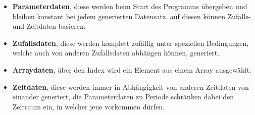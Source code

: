 \begin{itemize}
  \item \textbf{Parameterdaten}, diese werden beim Start des Programms übergeben und bleiben konstant bei jedem generierten Datensatz, auf diesen können Zufalls- und Zeitdaten basieren.
  \item \textbf{Zufallsdaten}, diese werden komplett zufällig unter speziellen Bedingungen, welche auch von anderen Zufallsdaten abhängen können, generiert.
  \item \textbf{Arraydaten}, über den Index wird ein Element aus einem Array ausgewählt.
  \item \textbf{Zeitdaten}, diese werden immer in Abhängigkeit von anderen Zeitdaten von einander generiert, die Parameterdaten zu Periode schränken dabei den Zeitraum ein, in welcher jene vorkommen dürfen.
\end{itemize}
